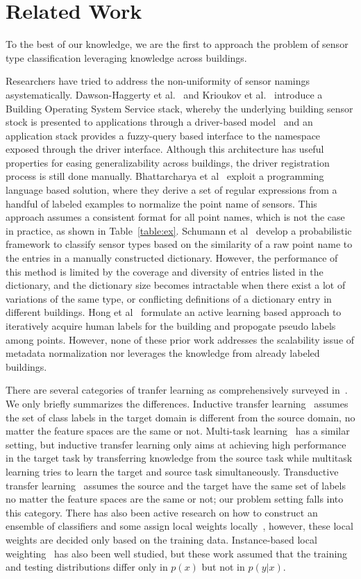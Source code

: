 \section{Related Work}
To the best of our knowledge, we are the first to approach the problem of sensor type classification leveraging knowledge across buildings.

Researchers have tried to address the non-uniformity of sensor namings asystematically.
Dawson-Haggerty et al.~\cite{boss} and Krioukov et al.~\cite{bas}
introduce a Building Operating System Service stack, whereby
the underlying building sensor stock is presented to applications through a driver-based model \
and an application stack provides a fuzzy-query based interface to the namespace exposed 
through the driver interface.
Although this architecture has useful properties for easing generalizability across
buildings, the driver registration process is still done manually. 
Bhattarcharya et al~\cite{arka} exploit a programming language based solution, 
where they derive a set of regular expressions from a handful of labeled examples 
to normalize the point name of sensors. 
This approach assumes a consistent format for all point names, which is not the case in practice, as shown in Table~\ref{table:ex}. 
Schumann et al~\cite{ibm} develop a probabilistic framework to classify sensor types 
based on the similarity of a raw point name to the entries in a manually constructed dictionary. 
However, the performance of this method is limited by the coverage and diversity of entries listed in the dictionary, and the dictionary size becomes intractable when there exist a lot of variations of the same type, or conflicting definitions of a dictionary entry in different buildings.
Hong et al~\cite{cikm} formulate an active learning based approach to iteratively 
acquire human labels for the building and propogate pseudo labels among points.
However, none of these prior work addresses the scalability issue of metadata 
normalization nor leverages the knowledge from already labeled buildings.

There are several categories of tranfer learning as comprehensively surveyed in~\cite{transfer1}. We only briefly summarizes the differences. Inductive transfer learning~\cite{transfer2} assumes the set of class labels in the target domain is different from the source domain, no matter the feature spaces are the same or not. Multi-task learning~\cite{multitask} has a similar setting, but inductive transfer learning only aims at achieving high performance in the target task by transferring knowledge from the source task while multitask learning tries to learn the target and source task simultaneously. Transductive transfer learning~\cite{transfer3} assumes the source and the target have the same set of labels no matter the feature spaces are the same or not; our problem setting falls into this category. There has also been active research on how to construct an ensemble of classifiers and some assign local weights locally~\cite{ensem1,ensem2}, however, these local weights are decided only based on the training data.
Instance-based local weighting~\cite{weight1,weight2,weight3} has also been well studied, but these work assumed that the training and testing distributions differ only in $p(x)$ but not in $p(y|x)$.

